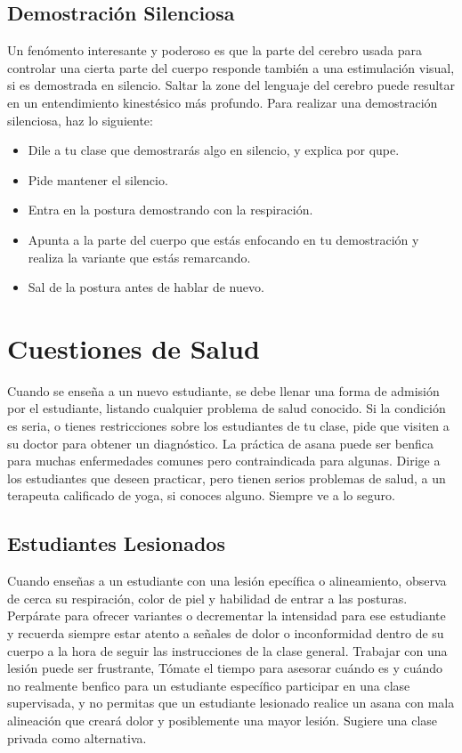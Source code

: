 \subsection{Demostración Silenciosa}
Un fenómento interesante y poderoso es que la parte del cerebro usada para controlar una cierta parte del cuerpo responde tambi\'en a una estimulación visual, si es demostrada en silencio. Saltar la zone del lenguaje del cerebro puede resultar en un entendimiento kinest\'esico más profundo. Para realizar una demostración silenciosa, haz lo siguiente:

\begin{itemize}
	\item Dile a tu clase que demostrarás algo en silencio, y explica por qupe.
	\item Pide mantener el silencio.
	\item Entra en la postura demostrando con la respiración.
	\item Apunta a la parte del cuerpo que estás enfocando en tu demostración y realiza la variante que estás remarcando.
	\item Sal de la postura antes de hablar de nuevo.
\end{itemize}

\section{Cuestiones de Salud}
Cuando se enseña a un nuevo estudiante, se debe llenar una forma de admisión por el estudiante, listando cualquier problema de salud conocido. Si la condición es seria, o tienes restricciones sobre los estudiantes de tu clase, pide que visiten a su doctor para obtener un diagnóstico. La práctica de asana puede ser benfica para muchas enfermedades comunes pero contraindicada para algunas. Dirige a los estudiantes que deseen practicar, pero tienen serios problemas de salud, a un terapeuta calificado de yoga, si conoces alguno. Siempre ve a lo seguro.

\subsection{Estudiantes Lesionados}
Cuando enseñas a un estudiante con una lesión epecífica o alineamiento, observa de cerca su respiración, color de piel y habilidad de entrar a las posturas. Perpárate para ofrecer variantes o decrementar la intensidad para ese estudiante y recuerda siempre estar atento a señales de dolor o inconformidad dentro de su cuerpo a la hora de seguir las instrucciones de la clase general. Trabajar con una lesión puede ser frustrante, Tómate el tiempo para asesorar cuándo es y cuándo no realmente benfico para un estudiante específico participar en una clase supervisada, y no permitas que un estudiante lesionado realice un asana con mala alineación que creará dolor y posiblemente una mayor lesión. Sugiere una clase privada como alternativa.


